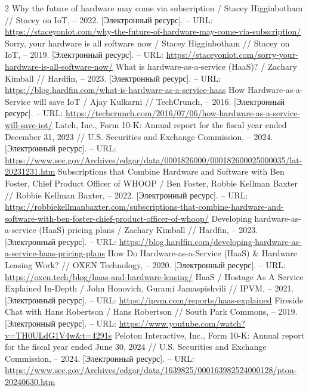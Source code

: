 \documentclass{article}
\begin{document}
\begin{thebibliography}{2}
 Why the future of hardware may come via subscription / Stacey Higginbotham // Stacey on IoT, – 2022. [Электронный ресурс]. – URL: \url{https://staceyoniot.com/why-the-future-of-hardware-may-come-via-subscription/}
 Sorry, your hardware is all software now / Stacey Higginbotham // Stacey on IoT, – 2019. [Электронный ресурс]. – URL: \url{https://staceyoniot.com/sorry-your-hardware-is-all-software-now/}
 What is hardware-as-a-service (HaaS)? / Zachary Kimball // Hardfin, – 2023. [Электронный ресурс]. – URL: \url{https://blog.hardfin.com/what-is-hardware-as-a-service-haas}
 How Hardware-as-a-Service will save IoT / Ajay Kulkarni // TechCrunch, – 2016. [Электронный ресурс]. – URL: \url{https://techcrunch.com/2016/07/06/how-hardware-as-a-service-will-save-iot/}
 Latch, Inc., Form 10-K: Annual report for the fiscal year ended December 31, 2023 // U.S. Securities and Exchange Commission, – 2024. [Электронный ресурс]. – URL: \url{https://www.sec.gov/Archives/edgar/data/0001826000/000182600025000035/lat-20231231.htm}
 Subscriptions that Combine Hardware and Software with Ben Foster, Chief Product Officer of WHOOP / Ben Foster, Robbie Kellman Baxter // Robbie Kellman Baxter, – 2022. [Электронный ресурс]. – URL: \url{https://robbiekellmanbaxter.com/subscriptions-that-combine-hardware-and-software-with-ben-foster-chief-product-officer-of-whoop/}
 Developing hardware-as-a-service (HaaS) pricing plans / Zachary Kimball // Hardfin, – 2023. [Электронный ресурс]. – URL: \url{https://blog.hardfin.com/developing-hardware-as-a-service-haas-pricing-plans}
 How Do Hardware-as-a-Service (HaaS) \& Hardware Leasing Work? // OXEN Technology, – 2020. [Электронный ресурс]. – URL: \url{https://oxen.tech/blog/haas-and-hardware-leasing/}
 HaaS / Hostage As A Service Explained In-Depth / John Honovich, Gurami Jamaspishvili // IPVM, – 2021. [Электронный ресурс]. – URL: \url{https://ipvm.com/reports/haas-explained}
 Fireside Chat with Hans Robertson / Hans Robertson // South Park Commons, – 2019. [Электронный ресурс]. – URL: \url{https://www.youtube.com/watch?v=TH0ULdG1V4w&t=4291s}
 Peloton Interactive, Inc., Form 10-K: Annual report for the fiscal year ended June 30, 2024 // U.S. Securities and Exchange Commission, – 2024. [Электронный ресурс]. – URL: \url{https://www.sec.gov/Archives/edgar/data/1639825/000163982524000128/pton-20240630.htm}

\end{thebibliography}
\end{document}
